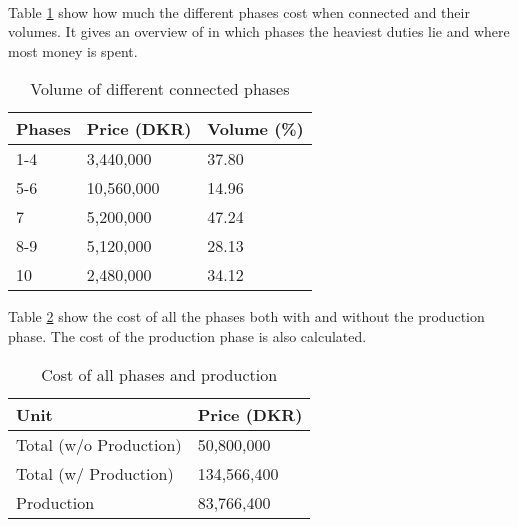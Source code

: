 ~\\

Table \ref{tab:VolumeOfPhases} show how much the different phases cost when connected and their volumes. It gives an overview of in which phases the heaviest duties lie and where most money is spent.

\begin{table}[H]
\centering
\begin{tabular}{|l|ll|}
\hline
\textbf{Phases} & \textbf{Price (DKR)} & \textbf{Volume (\%)} \\ \hline
1-4             & 3,440,000                  & 37.80                \\
5-6             & 10,560,000                 & 14.96                \\
7               & 5,200,000                  & 47.24                \\
8-9             & 5,120,000                  & 28.13                \\
10              & 2,480,000                  & 34.12                \\ \hline
\end{tabular}
\caption{Volume of different connected phases}
\label{tab:VolumeOfPhases}
\end{table}

Table \ref{tab:CostOfAllPhases} show the cost of all the phases both with and without the production phase. The cost of the production phase is also calculated.

\begin{table}[H]
\centering
\begin{tabular}{|l|l|}
\hline
\textbf{Unit}          & \textbf{Price (DKR)} \\ \hline
Total (w/o Production) & 50,800,000           \\
Total (w/ Production)  & 134,566,400          \\
Production             & 83,766,400           \\ \hline
\end{tabular}
\caption{Cost of all phases and production}
\label{tab:CostOfAllPhases}
\end{table}